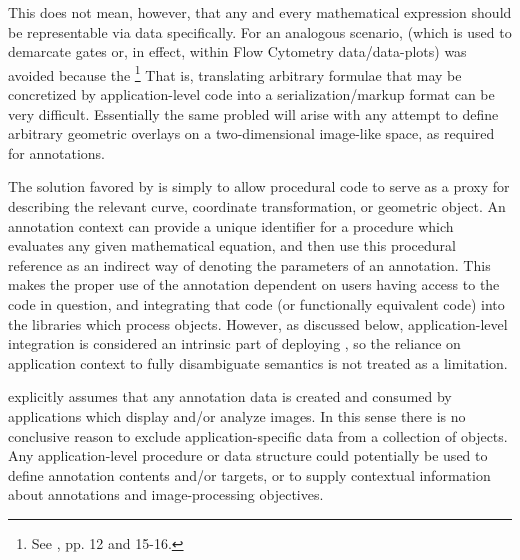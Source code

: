 {\begin{description}
This does not mean, however, that any and every 
mathematical expression should be representable 
via \AXFI{} data specifically.  For an analogous 
scenario, \GatingML{} (which is used to 
demarcate gates or, in effect,  within 
Flow Cytometry data/data-plots)  
was avoided because the \footnote{See , pp. 12 
and 15-16.}  That is, translating arbitrary 
formulae that may be concretized by application-level 
code into a serialization/markup format can be very 
difficult.  Essentially the same probled will arise 
with any attempt to define arbitrary geometric 
overlays on a two-dimensional image-like space, 
as required for \AXFI{} annotations. 

The solution favored by \AXFI{} is simply to allow 
procedural code to serve as a proxy for describing 
the relevant curve, coordinate transformation, or 
geometric object.  An \AXFI{} annotation context 
can provide a unique identifier for a procedure 
which evaluates any given mathematical equation, 
and then use this procedural reference as 
an indirect way of denoting the parameters of 
an annotation.  This makes the proper use 
of the annotation dependent on users having 
access to the code in question, and integrating 
that code (or functionally equivalent code) 
into the libraries which process \AXFI{} 
objects.  However, as discussed below, 
application-level integration is considered 
an intrinsic part of deploying \AXFI{}, so 
the reliance on application context to 
fully disambiguate \AXFI{} semantics is 
not treated as a limitation.

\item[Application-Level Algorithms, Procedures, 
and Data Types]  \lAXFI{} explicitly assumes 
that any annotation data is created and consumed 
by applications which display and/or analyze 
images.  In this sense there is no 
conclusive reason to exclude application-specific 
data from a collection of \AXFI{} objects.  
Any application-level procedure or data structure  
could potentially be used to define annotation 
contents and/or targets, or to supply contextual 
information about annotations and image-processing 
objectives.  


\end{description}}
